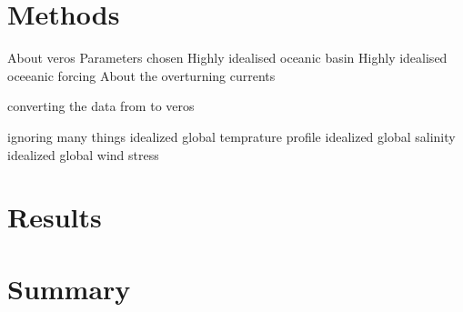\documentclass[a4paper]{article}
\begin{document}
\begin{multicols}{2}
\section{Methods}

About veros
Parameters chosen
Highly idealised oceanic basin
Highly idealised oceeanic forcing
About the overturning currents

converting the data from \cite{Muller2008Mar} to veros

ignoring many things
idealized global temprature profile
idealized global salinity
idealized global wind stress


\section{Results}

\section{Summary}

\printbibliography

\end{multicols}
\end{document}
